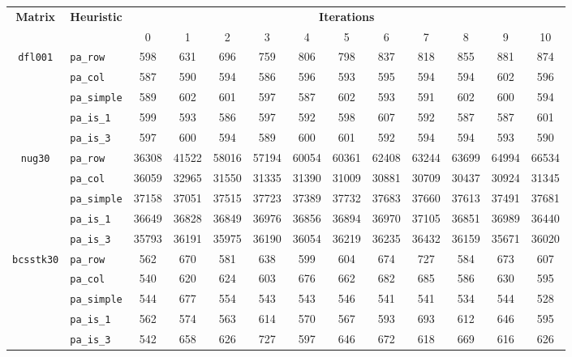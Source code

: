 \begin{table}
	\centering
	\renewcommand{\arraystretch}{1.2}
	\begin{tabular}{|c|l|c||c|c|c|c|c|c|c|c|c|c|}
		\hline
		\multirow{2}{*}{\textbf{Matrix}} &\multirow{2}{*}{\textbf{Heuristic}} & \multicolumn{11}{c|}{\textbf{Iterations}} \\ \cline{3-13} 
		&& 0 & 1 & 2 & 3 & 4 & 5 & 6 & 7 & 8 & 9 & 10 \\ \hline
		\multirow{5}{*}{\texttt{dfl001}}		&\verb|pa_row| & 598 & 631 & 696 & 759 & 806 & 798 & 837 & 818 & 855 & 881 & 874 \\ 
		&\verb|pa_col| &  587&  590 & 594 & 586 & 596 & 593 & 595 & 594 & 594 & 602 & 596 \\ 
		&\verb|pa_simple| & 589 & 602 & 601 & 597 & 587 & 602 & 593 & 591 & 602 & 600 & 594 \\
		&\verb|pa_is_1| & 599 & 593 & 586 & 597 & 592 & 598 & 607 & 592 & 587 & 587  & 601 \\
		&\verb|pa_is_3| & 597 & 600 & 594 & 589 & 600 & 601 & 592 & 594 & 594 & 593 & 590 \\
		\hline
		\multirow{5}{*}{\texttt{nug30}}		&\verb|pa_row| & 	36308 & 41522 & 58016 & 57194 & 60054 & 60361 & 62408 & 63244 & 63699 & 64994 & 66534 \\ 
		&\verb|pa_col| & 36059 & 32965&  31550 & 31335 & 31390 & 31009 & 30881 & 30709 & 30437 & 30924 & 31345 \\
		&\verb|pa_simple| & 37158 & 37051 & 37515 & 37723 & 37389 & 37732 & 37683 & 37660 & 37613 & 37491 & 37681 \\
		&\verb|pa_is_1| & 	36649 & 36828 & 36849 & 36976 & 36856 & 36894 & 36970 & 37105 & 36851 & 36989 & 36440 \\
		&\verb|pa_is_3| & 35793 & 36191 & 35975 & 36190 & 36054 & 36219 & 36235 & 36432 & 36159 & 35671 & 36020 \\ \hline
		\multirow{5}{*}{\texttt{bcsstk30}}		&\verb|pa_row| &  562 & 670 & 581&  638 &  599 &  604 &  674 &  727&   584&   673 &  607 \\ 
		&\verb|pa_col| & 540 &  620 & 624 & 603 & 676 & 662 & 682 & 685 & 586 & 630 & 595 \\ 
		&\verb|pa_simple| &544 & 677 & 554 & 543 & 543 & 546 & 541 & 541 & 534 & 544 & 528 \\
		&\verb|pa_is_1| & 562 & 574 & 563 & 614 & 570 & 567 & 593 & 693 & 612 & 646 & 595 \\
		&\verb|pa_is_3| &542 & 658 & 626 & 727 & 597 & 646 & 672 & 618 & 669 & 616 & 626 \\ \hline

\end{tabular}
\end{table}
